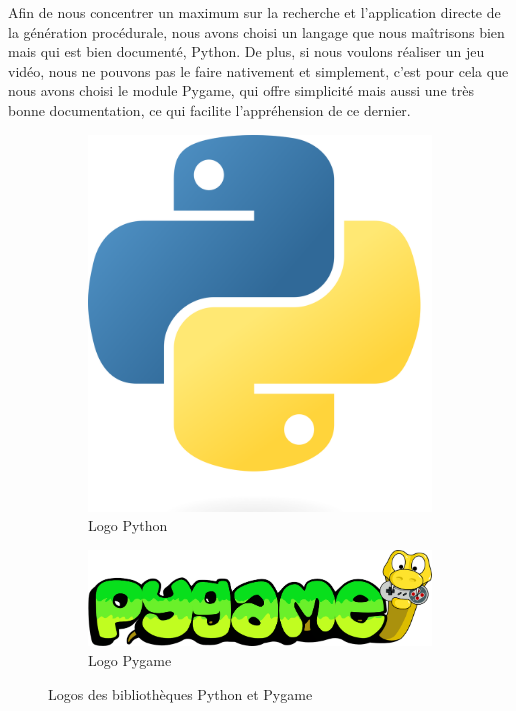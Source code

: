 \documentclass{article}
\begin{document}
Afin de nous concentrer un maximum sur la recherche et l'application directe de la génération procédurale, nous avons choisi un langage que nous maîtrisons bien mais qui est bien documenté, Python. De plus, si nous voulons réaliser un jeu vidéo, nous ne pouvons pas le faire nativement et simplement, c'est pour cela que nous avons choisi le module Pygame, qui offre simplicité mais aussi une très bonne documentation, ce qui facilite l’appréhension de ce dernier.\par

\begin{figure}[!h]
  \centering
  \begin{subfigure}[b]{0.2\textwidth}
    \centering
    \includegraphics[width=\textwidth]{assets/python_logo.png}
    \caption{Logo Python}
  \end{subfigure}
  \hspace{0.6cm}
  \begin{subfigure}[b]{0.2\textwidth}
    \centering
    \includegraphics[width=\textwidth]{assets/pygame_logo.png}
    \caption{Logo Pygame}
  \end{subfigure}
  \caption{Logos des bibliothèques Python et Pygame}
  \label{fig:logos_python}
\end{figure}
\end{document}

